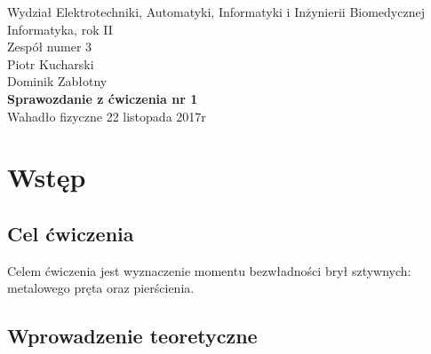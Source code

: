 \documentclass[a4paper,12pts]{article}
\begin{document}
	\thispagestyle{empty}
	\begin{flushleft}
		Wydział Elektrotechniki, Automatyki, Informatyki i Inżynierii Biomedycznej \\
		Informatyka, rok II \\
		Zespół numer 3 \\
		Piotr Kucharski \\
		Dominik Zabłotny \\
		\vspace*{\fill}
		{\large \textbf{Sprawozdanie z ćwiczenia nr 1} } \\
		Wahadło fizyczne		
		\vfill	
		22 listopada 2017r
	\end{flushleft}
	
	\newpage
	
	
	\section{Wstęp}
	\subsection{Cel ćwiczenia}
	Celem ćwiczenia jest wyznaczenie momentu bezwładności brył sztywnych: metalowego pręta oraz pierścienia.
	
	\subsection{Wprowadzenie teoretyczne}
	
	
\end{document}
